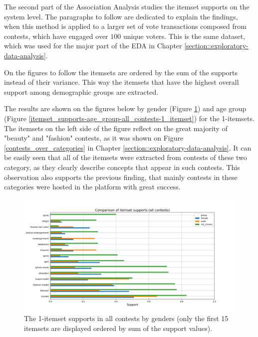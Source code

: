 The second part of the Association Analysis studies the itemset supports on the system level. The paragraphs to follow are dedicated to explain the findings, when this method is applied to a larger set of vote transactions composed from contests, which have engaged over $100$ unique voters. This is the same dataset, which was used for the major part of the EDA in Chapter \ref{section::exploratory-data-analysis}.

On the figures to follow the itemsets are ordered by the sum of the supports instead of their variance. This way the itemsets that have the highest overall support among demographic groups are extracted.

The results are shown on the figures below by gender (Figure \ref{itemset_supports-gender-all_contests-1_itemset}) and age group (Figure \ref{itemset_supports-age_group-all_contests-1_itemset}) for the 1-itemsets. The itemsets on the left side of the figure reflect on the great majority of "beauty" and "fashion" contests, as it was shown on Figure \ref{contests_over_categories} in Chapter \ref{section::exploratory-data-analysis}. It can be easily seen that all of the itemsets were extracted from contests of these two category, as they clearly describe concepts that appear in such contests. This observation also supports the previous finding, that mainly contests in these categories were hosted in the platform with great success.

\begin{figure}[h] 
    \begin{center}
        \includegraphics[width=1.0\textwidth]{Images/itemset_supports-gender-all_contests-1_itemset.png}
        \caption{The 1-itemset supports in all contests by genders (only the first 15 itemsets are displayed ordered by sum of the support values).}
        \label{itemset_supports-gender-all_contests-1_itemset}
    \end{center}
\end{figure}


